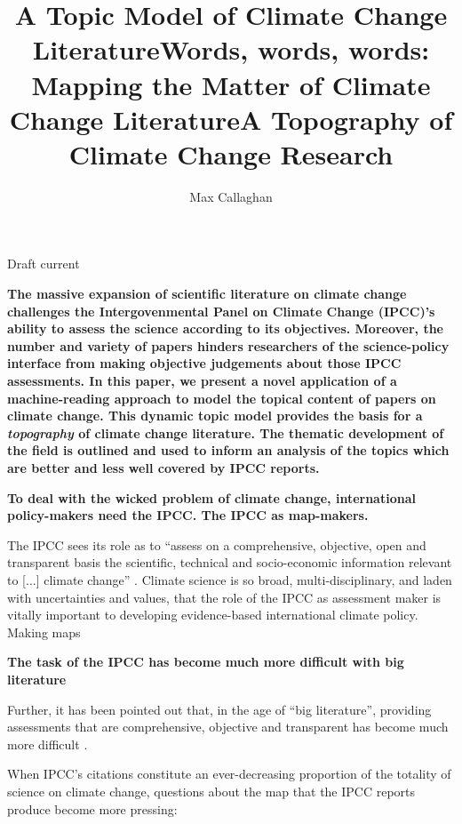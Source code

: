 \documentclass{article}
\title{A Topic Model of Climate Change Literature}
\title{Words, words, words: Mapping the Matter of Climate Change Literature}
\title{A Topography of Climate Change Research}
\author[1,2]{Max Callaghan}
\affil[1]{Mercator Research Institute on Global Commons and Climate Change, Torgauer Straße, 10829 Berlin, Germany}
\affil[2]{School of Earth and Environment, University of Leeds, Leeds LS2 9JT, United Kingdom}
\makeatletter
\renewcommand{\maketitle}{\bgroup\setlength{\parindent}{0pt}
	\begin{flushleft}
		
		{\huge\textbf{\@title}}
		
		\bigskip
		
 		{\large\textbf{\@author}}
 		
 		\bigskip
 		
 		{\large{Draft current \@date}}
 		
	\end{flushleft}\egroup
}
\newcommand{\multicollinenumbers}{
	\linenumbers
	\def\makeLineNumber{\docolaction
		{\makeLineNumberLeft}
		{}
		{\makeLineNumberRight}
		}
}
\makeatother
\begin{document}
\maketitle


\begin{linenumbers}

\noindent\textbf{	
The massive expansion of scientific literature on climate change challenges the Intergovenmental Panel on Climate Change (IPCC)'s ability to assess the science according to its objectives. 
Moreover, the number and variety of papers hinders researchers of the science-policy interface from making objective judgements about those IPCC assessments. In this paper, we present a novel application of a machine-reading approach to model the topical content of papers on climate change. This dynamic topic model provides the basis for a \textit{topography} of climate change literature. The thematic development of the field is outlined and used to inform an analysis of the topics which are better and less well covered by IPCC reports.
}



\bigskip

	
\bigskip
\noindent\textbf{To deal with the wicked problem of climate change, international policy-makers need the IPCC. The IPCC as map-makers.}

The IPCC sees its role as to ``assess on a comprehensive, objective, open and transparent basis the scientific, technical and socio-economic information relevant to [...] climate change'' \citep{IPCC2013}. Climate science is so broad, multi-disciplinary, and laden with uncertainties and values, that the role of the IPCC as assessment maker is vitally important to developing evidence-based international climate policy.
Making maps \citep{Edenhofer2015}



\bigskip
\noindent\textbf{The task of the IPCC has become much more difficult with big literature}

Further, it has been pointed out that, in the age of ``big literature'', providing assessments that are comprehensive, objective and transparent has become much more difficult \citep{Minx2017l}. 

When IPCC's citations constitute an ever-decreasing proportion of the totality of science on climate change, questions about the map that the IPCC reports produce become more pressing:


\end{linenumbers}
\end{document}
